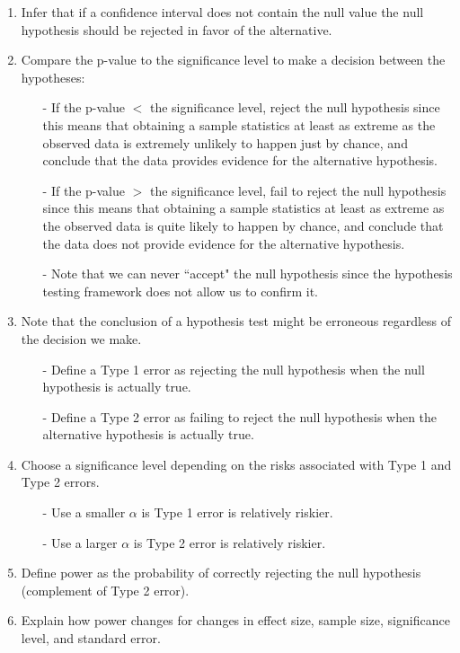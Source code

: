 \documentclass[11pt]{article}
\begin{document}
\begin{enumerate}[resume]
\item Infer that if a confidence interval does not contain the null value the null hypothesis should be rejected in favor of the alternative.

\item Compare the p-value to the significance level to make a decision between the hypotheses:
\begin{itemize}
\item[-] If the p-value $<$ the significance level, reject the null hypothesis since this means that obtaining a sample statistics at least as extreme as the observed data is extremely unlikely to happen just by chance, and conclude that the data provides evidence for the alternative hypothesis.
\item[-] If the p-value $>$ the significance level, fail to reject the null hypothesis since this means that obtaining a sample statistics at least as extreme as the observed data is quite likely to happen by chance, and conclude that the data does not provide evidence for the alternative hypothesis.
\item[-] Note that we can never ``accept" the null hypothesis since the hypothesis testing framework does not allow us to confirm it.
\end{itemize}

\item Note that the conclusion of a hypothesis test might be erroneous regardless of the decision we make.
\begin{itemize}
\item[-] Define a Type 1 error as rejecting the null hypothesis when the null hypothesis is actually true.
\item[-] Define a Type 2 error as failing to reject the null hypothesis when the alternative hypothesis is actually true.
\end{itemize}

\item Choose a significance level depending on the risks associated with Type 1 and Type 2 errors.
\begin{itemize}
\item[-] Use a smaller $\alpha$ is Type 1 error is relatively riskier.
\item[-] Use a larger $\alpha$ is Type 2 error is relatively riskier.
\end{itemize}

\item Define power as the probability of correctly rejecting the null hypothesis (complement of Type 2 error).

\item Explain how power changes for changes in effect size, sample size, significance level, and standard error.

\end{enumerate}
\end{document}

